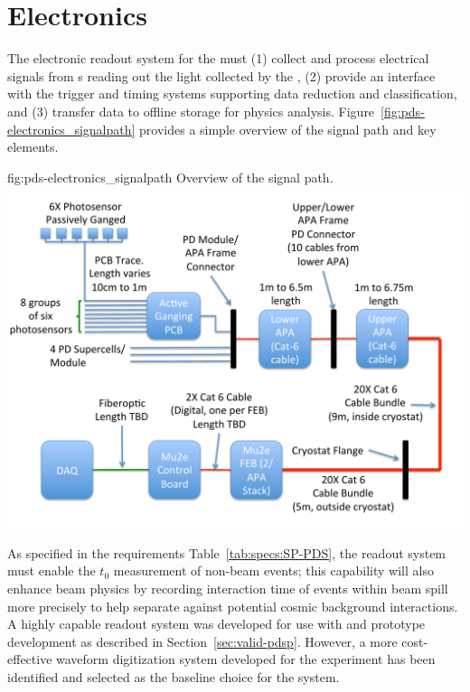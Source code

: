 
\section{Electronics}
\label{sec:fdsp-pd-pde}

The electronic readout system for the  must (1) collect and process electrical signals from s reading out the light collected by the , (2) provide an interface with the trigger and timing systems supporting data reduction and classification, and (3) transfer data to offline storage for physics analysis. Figure~\ref{fig:pds-electronics_signalpath} provides a simple overview of the signal path and key elements. 
\begin{dunefigure}
 {fig:pds-electronics_signalpath}
 {Overview of the  signal path.}
\includegraphics[width=15cm]{graphics/pds-signal-routing-diagram-r3.pdf}
\end{dunefigure}


As specified in the requirements Table~\ref{tab:specs:SP-PDS}, the readout system must enable the $t_0$ measurement of non-beam events; this capability will also enhance beam physics by recording interaction time of events within 
beam spill more precisely to help separate against potential cosmic background interactions. A highly capable readout system was developed for use with  and prototype development as described in Section~\ref{sec:valid-pdsp}. However, a more cost-effective waveform digitization system developed for the  experiment has been identified and selected as the baseline choice for the  system. 


